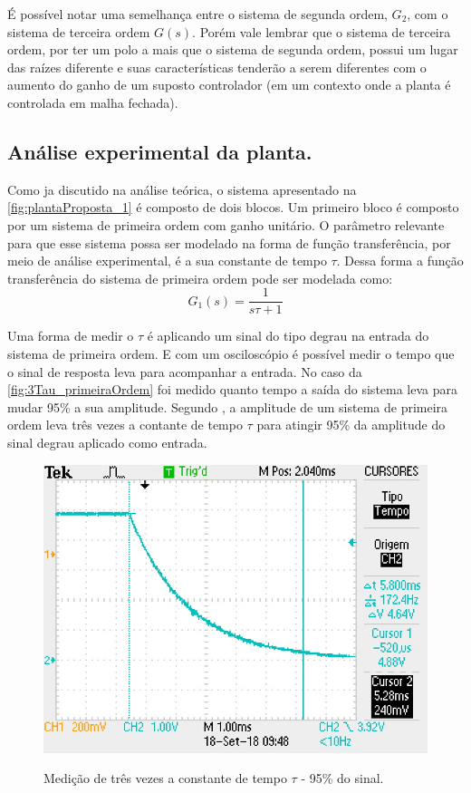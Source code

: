 \documentclass[
	article,			%
	11pt,				%
	oneside,			%
	a4paper,			%
	english,			%
	brazil,				%
	sumario=tradicional
	]{abntex2}
\begin{document}
É possível notar uma semelhança entre o sistema de segunda ordem, $G_{2}$, com o sistema de terceira ordem $G(s)$. Porém vale lembrar que o sistema de terceira ordem, por ter um polo a mais que o sistema de segunda ordem, possui um lugar das raízes diferente e suas características tenderão a serem diferentes com o aumento do ganho de um suposto controlador (em um contexto onde a planta é controlada em malha fechada).
\pagebreak

\subsection{Análise experimental da planta.}

Como ja discutido na análise teórica, o sistema apresentado na \autoref{fig:plantaProposta_1} é composto de dois blocos.
Um primeiro bloco é composto por um sistema de primeira ordem com ganho unitário.
O parâmetro relevante para que esse sistema possa ser modelado na forma de função transferência, por meio de análise experimental, é a sua constante de tempo $\tau$.
Dessa forma a função transferência do sistema de primeira ordem pode ser modelada como:
$$
	G_{1}(s) = \frac{1}{s\tau + 1}
$$

Uma forma de medir o $\tau$ é aplicando um sinal do tipo degrau na entrada do sistema de primeira ordem. E com um osciloscópio é possível medir o tempo que o sinal de resposta leva para acompanhar a entrada. 
No caso da \autoref{fig:3Tau_primeiraOrdem} foi medido quanto tempo a saída do sistema leva para mudar 95\% a sua amplitude. 
Segundo , a amplitude de um sistema de primeira ordem leva três vezes a contante de tempo $\tau$ para atingir 95\% da amplitude do sinal degrau aplicado como entrada.

\begin{figure}[htb!]
	\centering
	\caption{Medição de três vezes a constante de tempo $\tau$ - 95\% do sinal.}
	\includegraphics[scale=1.4]{./img/3Tau_primeiraOrdem.JPG}
	\label{fig:3Tau_primeiraOrdem}
\end{figure}
\end{document}
